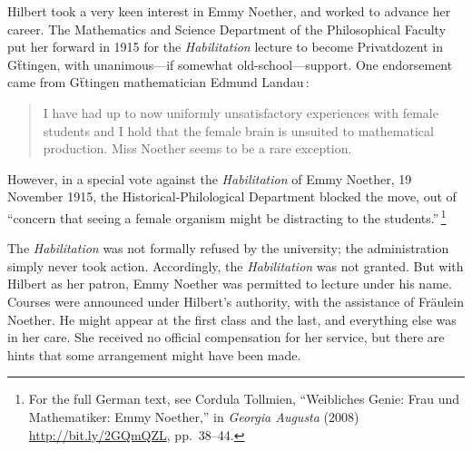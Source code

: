 \documentclass[twoside,symmetric]{tufte-handout}
\begin{document}
Hilbert took a very keen interest in Emmy Noether, and worked to advance her career.
The Mathematics and Science Department of the Philosophical Faculty put her forward in 1915 for the \emph{Habilitation} lecture to become Privatdozent in G\"ttingen, with unanimous---if somewhat old-school---support. One endorsement came from G\"ttingen mathematician Edmund Landau$\,$\cite{Schappa}:
\begin{quote}
I have had up to now uniformly unsatisfactory experiences with female students and I hold that the female brain is unsuited to mathematical production. Miss Noether seems to be a rare exception.
\end{quote}
However, in a special vote against the \emph{Habilitation} of Emmy Noether, 19 November 1915, the Historical-Philological Department blocked the move, out of ``concern that seeing a female organism might be distracting to the students.''$\,$\footnote{For the full German text, see Cordula Tollmien, ``Weibliches Genie: Frau und Mathematiker: Emmy Noether,'' in \emph{Georgia Augusta} (2008) \url{http://bit.ly/2GQmQZL}, pp.~38--44.}


The \emph{Habilitation} was not formally refused by the university; the administration simply never took action.
Accordingly, the \emph{Habilitation} was not granted. But with Hilbert as her patron, Emmy Noether was  permitted to lecture under his name. Courses were announced under Hilbert's authority, with the assistance of Fr\"aulein Noether. He might appear at the first class and the last, and everything else was in her care. She received no official compensation for her service, but there are hints that some arrangement might have been made.
\end{document}
